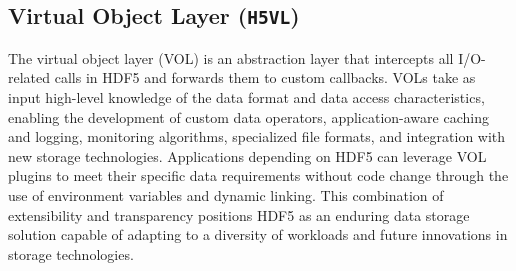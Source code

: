 \subsection{Virtual Object Layer (\texttt{H5VL})}\label{ref:vol}



The virtual object layer (VOL) is an abstraction layer that intercepts all I/O-related calls in HDF5 and forwards them to custom callbacks. VOLs take as input high-level knowledge of the data format and data access characteristics, enabling the development of custom data operators, application-aware caching and logging, monitoring algorithms, specialized file formats, and integration with new storage technologies. Applications depending on HDF5 can leverage VOL plugins to meet their specific data requirements without code change through the use of environment variables and dynamic linking. This combination of extensibility and transparency positions HDF5 as an enduring data storage solution capable of adapting to a diversity of workloads and future innovations in storage technologies.

